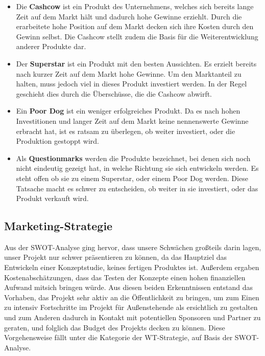   \begin{itemize}
    \item Die \textbf{Cashcow} ist ein Produkt des Unternehmens, welches sich bereits lange Zeit auf dem Markt hält und dadurch hohe Gewinne erziehlt. Durch die
    erarbeitete hohe Position auf dem Markt decken sich ihre Kosten durch den Gewinn selbst. Die Cashcow stellt zudem die Basis für die Weiterentwicklung anderer
    Produkte dar.

    \item Der \textbf{Superstar} ist ein Produkt mit den besten Aussichten. Es erzielt bereits nach kurzer Zeit auf dem Markt hohe Gewinne. Um den Marktanteil
    zu halten, muss jedoch viel in dieses Produkt investiert werden. In der Regel geschieht dies durch die Überschüsse, die die Cashcow abwirft.

    \item Ein \textbf{Poor Dog} ist ein weniger erfolgreiches Produkt. Da es nach hohen Investitionen und langer Zeit auf dem Markt keine nennenswerte
    Gewinne erbracht hat, ist es ratsam zu überlegen, ob weiter investiert, oder die Produktion gestoppt wird.

    \item Als \textbf{Questionmarks} werden die Produkte bezeichnet, bei denen sich noch nicht eindeutig gezeigt hat, in welche Richtung sie sich entwickeln werden.
    Es steht offen ob sie zu einem Superstar, oder einem Poor Dog werden. Diese Tatsache macht es schwer zu entscheiden, ob weiter in sie investiert, oder das Produkt
    verkauft wird.
  \end{itemize}

  \subsection{Marketing-Strategie}
  Aus der SWOT-Analyse ging hervor, dass unsere Schwächen großteils darin lagen, unser Projekt nur schwer präsentieren zu können, da das Hauptziel das Entwickeln
  einer Konzeptstudie, keines fertigen Produktes ist. Außerdem ergaben Kostenabschätzungen, dass das Testen der Konzepte einen hohen finanziellen Aufwand mitsich bringen
  würde. Aus diesen beiden Erkenntnissen entstand das Vorhaben, das Projekt sehr aktiv an die Öffentlichkeit zu bringen, um zum Einen zu intensiv Fortschritte im Projekt
  für Außenstehende als ersichtlich zu gestalten und zum Anderen dadurch in Kontakt mit potentiellen Sponsoren und Partner zu geraten, und folglich das Budget des Projekts
  decken zu können. Diese Vorgehensweise fällt unter die Kategorie der WT-Strategie, auf Basis der SWOT-Analyse.

